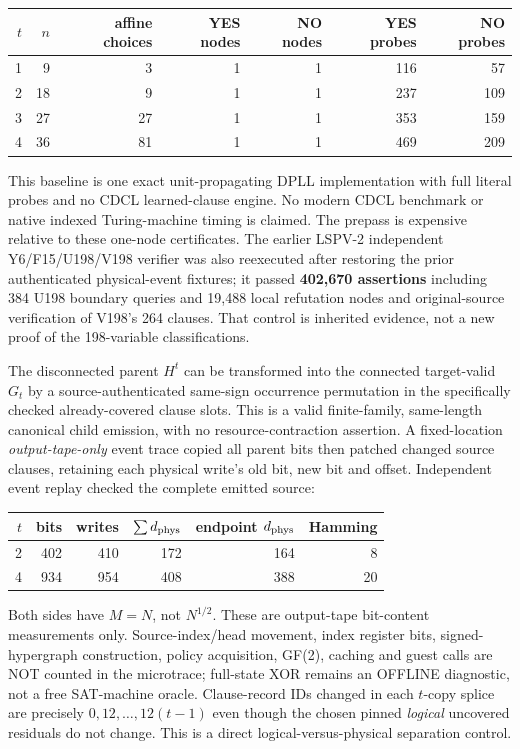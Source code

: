 \documentclass[11pt]{article}
\begin{document}
\begin{center}\small\begin{tabular}{rrrrrrr}\toprule
$t$ & $n$ & affine choices & YES nodes & NO nodes & YES probes & NO probes\\\midrule
1&9&3&1&1&116&57\\
2&18&9&1&1&237&109\\
3&27&27&1&1&353&159\\
4&36&81&1&1&469&209\\\bottomrule\end{tabular}\end{center}
This baseline is one exact unit-propagating DPLL implementation with full literal probes and no CDCL learned-clause engine. No modern CDCL benchmark or native indexed Turing-machine timing is claimed. The prepass is expensive relative to these one-node certificates. The earlier LSPV-2 independent Y6/F15/U198/V198 verifier was also reexecuted after restoring the prior authenticated physical-event fixtures; it passed \textbf{402,670 assertions} including 384 U198 boundary queries and 19,488 local refutation nodes and original-source verification of V198's 264 clauses. That control is inherited evidence, not a new proof of the 198-variable classifications.

The disconnected parent $H^t$ can be transformed into the connected target-valid $G_t$ by a source-authenticated same-sign occurrence permutation in the specifically checked already-covered clause slots. This is a valid finite-family, same-length canonical child emission, with no resource-contraction assertion. A fixed-location \emph{output-tape-only} event trace copied all parent bits then patched changed source clauses, retaining each physical write's old bit, new bit and offset. Independent event replay checked the complete emitted source:
\begin{center}\begin{tabular}{rrrrrr}\toprule
$t$ & bits & writes & $\sum d_{\rm phys}$ & endpoint $d_{\rm phys}$ & Hamming\\\midrule
2 &402&410&172&164&8\\
4 &934&954&408&388&20\\\bottomrule\end{tabular}\end{center}
Both sides have $M=N$, not $N^{1/2}$. These are output-tape bit-content measurements only. Source-index/head movement, index register bits, signed-hypergraph construction, policy acquisition, GF(2), caching and guest calls are NOT counted in the microtrace; full-state XOR remains an OFFLINE diagnostic, not a free SAT-machine oracle. Clause-record IDs changed in each $t$-copy splice are precisely $0,12,\ldots,12(t-1)$ even though the chosen pinned \emph{logical} uncovered residuals do not change. This is a direct logical-versus-physical separation control.
\end{document}
